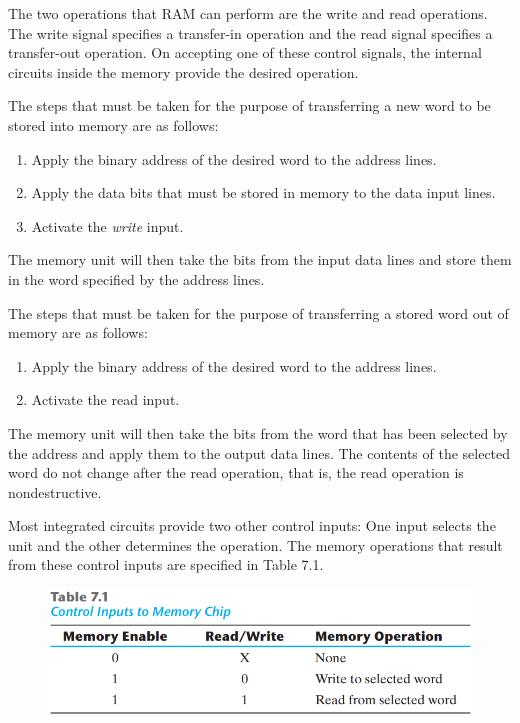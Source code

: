 The two operations that RAM can perform are the write and read operations. The write signal specifies a transfer-in operation and the read signal specifies a transfer-out operation. On accepting one of these control signals, the internal circuits inside the memory provide the desired operation.

The steps that must be taken for the purpose of transferring a new word to be stored into memory are as follows:
\begin{enumerate}
  \item Apply the binary address of the desired word to the address lines.
  \item Apply the data bits that must be stored in memory to the data input lines.
  \item Activate the \textit{write} input.
\end{enumerate}
\noindent The memory unit will then take the bits from the input data lines and store them in the word specified by the address lines.

The steps that must be taken for the purpose of transferring a stored word out of memory are as follows:
\begin{enumerate}
  \item Apply the binary address of the desired word to the address lines.
  \item Activate the read input.
\end{enumerate}
The memory unit will then take the bits from the word that has been selected by the address and apply them to the output data lines. The contents of the selected word do not change after the read operation, that is, the read operation is nondestructive.

Most integrated circuits provide two other control inputs: One input selects the unit and the other determines the operation. The memory operations that result from these control inputs are specified in Table 7.1.
\begin{figure}[H]
  \centering
  \includegraphics[width=\linewidth]{img/table-7.1.png}
  \label{table:7.1}
\end{figure}


